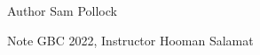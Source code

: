 \begin{DoxyAuthor}{Author}
Sam Pollock
\end{DoxyAuthor}
\begin{DoxyNote}{Note}
GBC 2022, Instructor Hooman Salamat 
\end{DoxyNote}
